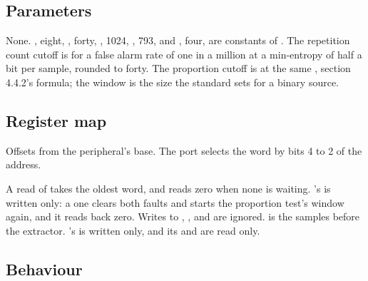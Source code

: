 \subsection*{Parameters}

None. , eight, , forty,
, 1024, , 793, and ,
four, are constants of . The repetition count cutoff is
 for a false alarm rate of one in a million at a
min-entropy  of half a bit per sample, rounded to forty. The
proportion cutoff is  at the same , section 4.4.2's
formula; the window is the size the standard sets for a binary source.

\subsection*{Register map}

Offsets from the peripheral's base. The port selects the word by bits
4 to 2 of the address.


A read of  takes the oldest word, and reads zero when none
is waiting. 's  is written only: a one clears
both faults and starts the proportion test's window again, and it
reads back zero. Writes to ,
,  and  are ignored. 
is the samples before the extractor. 's  is
written only, and its  and  are read only.


\subsection*{Behaviour}


